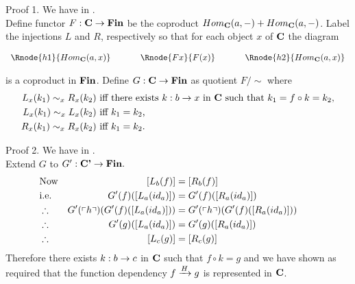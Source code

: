 \begin{frame}{Proof 1.}
We have \fgsourcediagram in \catc.\\
\medskip
Define functor $F: \catc \morph \Fin$ be the coproduct $Hom_{\catc}(a,-) + Hom_{\catc}(a,-)$.
Label the injections $L$ and $R$, respectively so that
for each object $x$ of $\catc$ the diagram
\begin{center}
$
\begin{array}{c p{0.5cm} c p{0.5cm} c  }
\Rnode{h1}{Hom_{\catc}(a,x)}  &&\Rnode{Fx}{F(x)}  &&   \Rnode{h2}{Hom_{\catc}(a,x)}       
\end{array} 
$
\end{center}
is a coproduct in $\Fin$.
\medskip
Define $G: \catc \morph \Fin$ as quotient $F/\sim$ where
\begin{align*}
L_x(k_1) \sim_x R_x(k_2) & \mbox{ iff there exists $k:b \morph x$ in $\catc$ such that $k_1 = f \circ k = k_2$,}\\
L_x(k_1) \sim_x L_x(k_2) & \mbox{ iff $k_1 = k_2$,} \\
R_x(k_1) \sim_x R_x(k_2) & \mbox{ iff $k_1 = k_2$.} \\
\end{align*} 
\end{frame}

\begin{frame}{Proof 2.}
We have   in \catcp.\\
\medskip
Extend $G$ to $G':\catcp \morph \Fin.$ \\

\medskip
\begin{align*}
&\mbox{Now} & [L_b(f)]                         &= [R_b(f)]                 \\
&\mbox{i.e.}& G'(f)([L_a(id_a)])              &= G'(f)([R_a(id_a)])       \\
&\therefore & G'(\qq{h}) (G'(f)([L_a(id_a)])) &= G'(\qq{h}) (G'(f)([R_a(id_a)])) \\
&\therefore & G'(g)([L_a(id_a)])              &= G'(g)([R_a(id_a)]) & &    \\
&\therefore & [L_c(g)]                        &= [R_c(g)] 
\end{align*}
Therefore there exists $k:b \morph c$ in 
$\catc$ such that $f \circ k = g$ and we have shown as required that the function dependency
$\fundep{H}{f}{g}$ is represented in $\catc$.
\end{frame}


